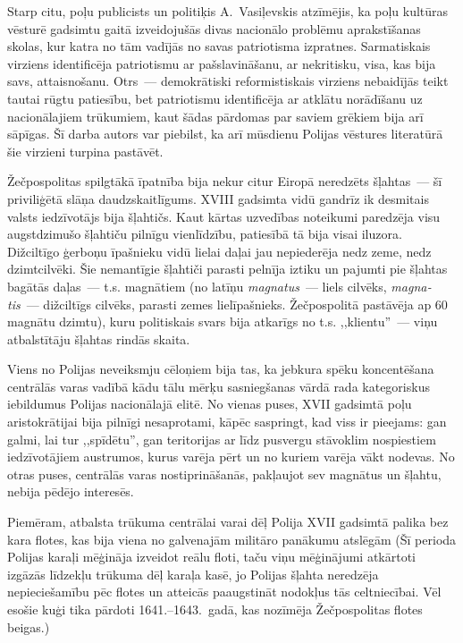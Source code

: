 \documentclass[twoside,a5paper,12pt,fleqn,openany]{extbook}
\newcommand{\latxti}[1]{\textit{\textlatin{#1}}}
\begin{document}
Starp citu, poļu publicists un politiķis A.~Vasiļevskis atzīmējis, ka poļu kultūras vēsturē gadsimtu gaitā izveidojušās divas nacionālo problēmu aprakstīšanas skolas, kur katra no tām vadījās no savas patriotisma izpratnes. Sarmatiskais virziens identificēja patriotismu ar pašslavināšanu, ar nekritisku, visa, kas bija savs, attaisnošanu. Otrs~--- demokrātiski reformistiskais virziens nebaidījās teikt tautai rūgtu patiesību, bet patriotismu identificēja ar atklātu norādīšanu uz nacionālajiem trūkumiem, kaut šādas pārdomas par saviem grēkiem bija arī sāpīgas. Šī darba autors var piebilst, ka arī mūsdienu Polijas vēstures literatūrā šie virzieni turpina pastāvēt.

Žečpospolitas spilgtākā īpatnība bija nekur citur Eiropā neredzēts šļahtas~--- šī priviliģētā slāņa daudzskaitlīgums. XVIII gadsimta vidū gandrīz ik desmitais valsts iedzīvotājs bija šļahtičs. Kaut kārtas uzvedības noteikumi paredzēja visu augstdzimušo šļahtiču pilnīgu vienlīdzību, patiesībā tā bija visai iluzora. Dižciltīgo ģerboņu īpašnieku vidū lielai daļai jau nepiederēja nedz zeme, nedz dzimtcilvēki. Šie nemantīgie šļahtiči parasti pelnīja iztiku un pajumti pie šļahtas bagātās daļas~--- t.s. magnātiem (no latīņu \latxti{magnatus}~--- liels cilvēks, \latxti{magnatis}~--- dižciltīgs cilvēks, parasti zemes lielīpašnieks. Žečpospolitā pastāvēja ap 60 magnātu dzimtu), kuru politiskais svars bija atkarīgs no t.s. ,,klientu''~--- viņu atbalstītāju šļahtas rindās skaita.

Viens no Polijas neveiksmju cēloņiem bija tas, ka jebkura spēku koncentēšana centrālās varas vadībā kādu tālu mērķu sasniegšanas vārdā rada kategoriskus iebildumus Polijas nacionālajā elitē. No vienas puses, XVII gadsimtā poļu aristokrātijai bija pilnīgi nesaprotami, kāpēc saspringt, kad viss ir pieejams: gan galmi, lai tur ,,spīdētu'', gan teritorijas ar līdz pusvergu stāvoklim nospiestiem iedzīvotājiem austrumos, kurus varēja pērt un no kuriem varēja vākt nodevas. No otras puses, centrālās varas nostiprināšanās, pakļaujot sev magnātus un šļahtu, nebija pēdējo interesēs.

Piemēram, atbalsta trūkuma centrālai varai dēļ Polija XVII gadsimtā palika bez kara flotes, kas bija viena no galvenajām militāro panākumu atslēgām (Šī perioda Polijas karaļi mēģināja izveidot reālu floti, taču viņu mēģinājumi atkārtoti izgāzās līdzekļu trūkuma dēļ karaļa kasē, jo Polijas šļahta neredzēja nepieciešamību pēc flotes un atteicās paaugstināt nodokļus tās celtniecībai. Vēl esošie kuģi tika pārdoti 1641.--1643.~gadā, kas nozīmēja Žečpospolitas flotes beigas.)
\end{document}
